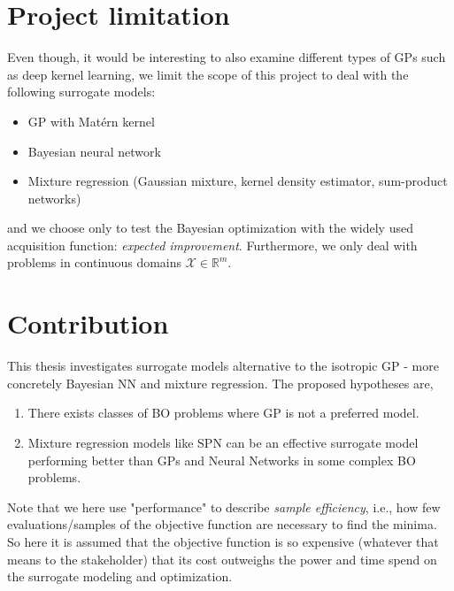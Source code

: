  \section{Project limitation}
Even though, it would be interesting to also examine different types of GPs such as deep kernel
learning, we limit the scope of this project to deal with the following surrogate models:
\begin{itemize}[noitemsep]
    \item GP with Matérn kernel
    \item Bayesian neural network
    \item Mixture regression (Gaussian mixture, kernel density estimator, sum-product networks)
\end{itemize}
and we choose only to test the Bayesian optimization with the widely used acquisition function:
\textit{expected improvement}. Furthermore, we only deal with problems in continuous domains
$\mathcal{X} \in \mathbb{R}^m$.

\section{Contribution}
This thesis investigates surrogate models alternative to the isotropic GP - more concretely Bayesian NN
and mixture regression. The proposed hypotheses are,


\begin{enumerate}[noitemsep]
    \item There exists classes of BO problems where GP is not a preferred model. 
    \item Mixture regression models like SPN can be an effective surrogate model
    performing better than GPs and Neural Networks in some complex BO problems. 
\end{enumerate}


Note that we here use "performance" to describe \textit{sample efficiency}, i.e., how few evaluations/samples
of the objective function are necessary to find the minima. So here it is assumed that the objective
function is so expensive (whatever that means to the stakeholder) that its cost outweighs the power
and time spend on the surrogate modeling and optimization.


    

